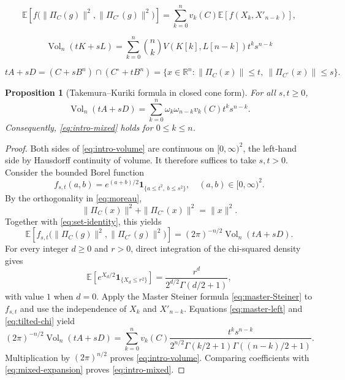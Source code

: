 \documentclass[10pt,a4paper]{amsart}
\newtheorem{proposition}{Proposition}
\newcommand{\E}{\mathbb{E}}
\newcommand{\R}{\mathbb{R}}
\newcommand{\vol}{\operatorname{Vol}}
\begin{document}
\begin{equation}\label{eq:master-Steiner}
 \E\left[f\bigl(\|\Pi_C(g)\|^2,\|\Pi_{C^\circ}(g)\|^2\bigr)\right]
 =\sum_{k=0}^n v_k(C)\E\left [f(X_k,X'_{n-k})\right],
\end{equation}

\begin{equation}\label{eq:mixed-expansion}
 \vol_n(tK+sL)
 =\sum_{k=0}^n\binom nk
 V(K[k],L[n-k])t^ks^{n-k}
\end{equation}

\begin{equation}\label{eq:set-identity}
 tA+sD
 =(C+sB^n)\cap(C^\circ+tB^n)
 =\{x\in\R^n:\|\Pi_C(x)\|\le t,
                  \ \|\Pi_{C^\circ}(x)\|\le s\}.
\end{equation}

\begin{proposition}[Takemura--Kuriki formula in closed cone form]
For all $s,t\ge0$,
\begin{equation}\label{eq:intro-volume}
 \vol_n(tA+sD)=\sum_{k=0}^n
 \omega_k\omega_{n-k}v_k(C)t^ks^{n-k}.
\end{equation}
Consequently, \eqref{eq:intro-mixed} holds for $0\le k\le n$.
\end{proposition}

\begin{proof}
Both sides of \eqref{eq:intro-volume} are continuous on $[0,\infty)^2$, the left-hand side by Hausdorff continuity of volume. It therefore suffices to take $s,t>0$. Consider the bounded Borel function
\[
 f_{s,t}(a,b)=e^{(a+b)/2}\mathbf 1_{\{a\le t^2,\ b\le s^2\}}, \quad (a,b)\in[0,\infty)^2.
\]
By the orthogonality in \eqref{eq:moreau},
\[
 \|\Pi_C(x)\|^2+\|\Pi_{C^\circ}(x)\|^2=\|x\|^2.
\]
Together with \eqref{eq:set-identity},  this yields
\begin{equation}\label{eq:master-left}
 \E\!\left[f_{s,t}\bigl(\|\Pi_C(g)\|^2, \|\Pi_{C^\circ}(g)\|^2\bigr)\right]=(2\pi)^{-n/2}\vol_n(tA+sD).
\end{equation}
For every integer $d\ge0$ and $r>0$, direct integration of the chi-squared density gives
\begin{equation}\label{eq:tilted-chi}
 \E\left[e^{X_d/2}\mathbf 1_{\{X_d\le r^2\}}\right]
 =\frac{r^d}{2^{d/2}\Gamma(d/2+1)},
\end{equation}
with value $1$ when $d=0$.  Apply the Master Steiner formula \eqref{eq:master-Steiner} to $f_{s,t}$ and use the independence of $X_k$ and $X'_{n-k}$.  Equations \eqref{eq:master-left} and
\eqref{eq:tilted-chi} yield
\[
 (2\pi)^{-n/2}\vol_n(tA+sD)=\sum_{k=0}^n v_k(C)\frac{t^ks^{n-k}}{2^{n/2}\Gamma(k/2+1)\Gamma((n-k)/2+1)}.
\]
Multiplication by $(2\pi)^{n/2}$ proves
\eqref{eq:intro-volume}.  Comparing coefficients with
\eqref{eq:mixed-expansion} proves \eqref{eq:intro-mixed}.
\end{proof}
\end{document}
